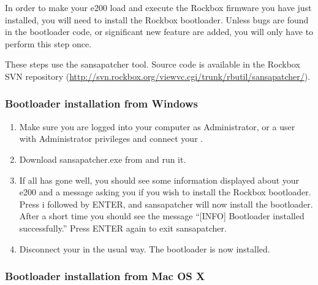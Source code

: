 
In order to make your e200 load and execute the Rockbox firmware you
have just installed, you will need to install the Rockbox
bootloader. Unless bugs are found in the bootloader code, or
significant new feature are added, you will only have to perform this
step once.

These steps use the sansapatcher tool. Source code is available in the Rockbox SVN repository (\url{http://svn.rockbox.org/viewvc.cgi/trunk/rbutil/sansapatcher/}).

\subsubsection{Bootloader installation from Windows}

\begin{enumerate}

\item Make sure you are logged into your computer as Administrator, or a 
user with Administrator privileges and connect your \dap{}.

\item Download sansapatcher.exe from 
and run it.

\item If all has gone well, you should see some information displayed about
your e200 and a message asking you if you wish to install the Rockbox
bootloader. Press i followed by ENTER, and sansapatcher will now
install the bootloader. After a short time you should see the message
``[INFO] Bootloader installed successfully.'' Press ENTER again to exit
sansapatcher.

\item Disconnect your \dap{} in the usual way. The bootloader is now installed. 

\end{enumerate}

\subsubsection{Bootloader installation from Mac OS X}

